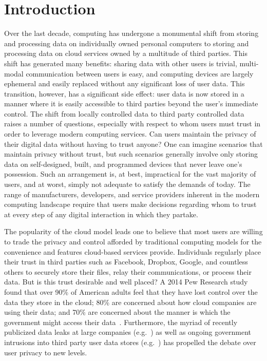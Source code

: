 \section{Introduction}
\label{sec:intro}

Over the last decade, computing has undergone a monumental shift from
storing and processing data on individually owned personal computers
to storing and processing data on cloud services owned by a multitude
of third parties. This shift has generated many benefits: sharing data
with other users is trivial, multi-modal communication between users
is easy, and computing devices are largely ephemeral and easily
replaced without any significant loss of user data. This transition,
however, has a significant side effect: user data is now stored in a
manner where it is easily accessible to third parties beyond the
user's immediate control. The shift from locally controlled data to
third party controlled data raises a number of questions, especially
with respect to whom users must trust in order to leverage modern
computing services. Can users maintain the privacy of their digital
data without having to trust anyone?  One can imagine scenarios that
maintain privacy without trust, but such scenarios generally involve
only storing data on self-designed, built, and programmed devices that
never leave one's possession. Such an arrangement is, at best,
impractical for the vast majority of users, and at worst, simply not
adequate to satisfy the demands of today. The range of manufacturers,
developers, and service providers inherent in the modern computing
landscape require that users make decisions regarding whom to trust at
every step of any digital interaction in which they partake.

The popularity of the cloud model leads one to believe that most users
are willing to trade the privacy and control afforded by traditional
computing models for the convenience and features cloud-based services
provide. Individuals regularly place their trust in third parties such
as Facebook, Dropbox, Google, and countless others to securely store
their files, relay their communications, or process their data. But is
this trust desirable and well placed? A 2014 Pew Research study found
that over 90\% of American adults feel that they have lost control
over the data they store in the cloud; 80\% are concerned about how
cloud companies are using their data; and 70\% are concerned about the
manner is which the government might access their
data~\cite{pew-privsec14}. Furthermore, the myriad of recently
publicized data leaks at large companies
(e.g.~\cite{apple-icloudleak}) as well as ongoing government
intrusions into third party user data stores
(e.g.~\cite{greenwald-prism}) has propelled the debate over user
privacy to new levels.


